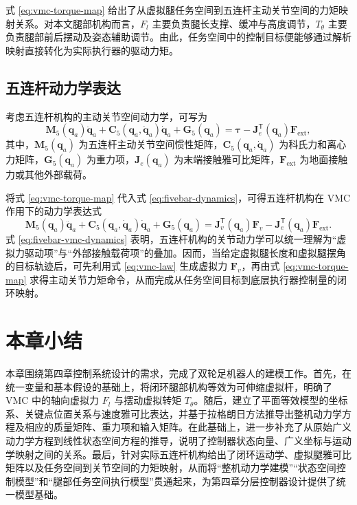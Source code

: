 式 \eqref{eq:vmc-torque-map} 给出了从虚拟腿任务空间到五连杆主动关节空间的力矩映射关系。对本文腿部机构而言，$F_l$ 主要负责腿长支撑、缓冲与高度调节，$T_\theta$ 主要负责腿部前后摆动及姿态辅助调节。由此，任务空间中的控制目标便能够通过解析映射直接转化为实际执行器的驱动力矩。

\subsection{五连杆动力学表达}

考虑五连杆机构的主动关节空间动力学，可写为
\begin{equation}
  \boldsymbol{M}_5(\boldsymbol{q}_a)\ddot{\boldsymbol{q}}_a
  +
  \boldsymbol{C}_5(\boldsymbol{q}_a, \dot{\boldsymbol{q}}_a)\dot{\boldsymbol{q}}_a
  +
  \boldsymbol{G}_5(\boldsymbol{q}_a)
  =
  \boldsymbol{\tau}
  -
  \boldsymbol{J}_e^\mathsf{T}(\boldsymbol{q}_a)\boldsymbol{F}_{\mathrm{ext}},
  \label{eq:fivebar-dynamics}
\end{equation}
其中，$\boldsymbol{M}_5(\boldsymbol{q}_a)$ 为五连杆主动关节空间惯性矩阵，$\boldsymbol{C}_5(\boldsymbol{q}_a, \dot{\boldsymbol{q}}_a)$ 为科氏力和离心力矩阵，$\boldsymbol{G}_5(\boldsymbol{q}_a)$ 为重力项，$\boldsymbol{J}_e(\boldsymbol{q}_a)$ 为末端接触雅可比矩阵，$\boldsymbol{F}_{\mathrm{ext}}$ 为地面接触力或其他外部载荷。

将式 \eqref{eq:vmc-torque-map} 代入式 \eqref{eq:fivebar-dynamics}，可得五连杆机构在 VMC 作用下的动力学表达式
\begin{equation}
  \boldsymbol{M}_5(\boldsymbol{q}_a)\ddot{\boldsymbol{q}}_a
  +
  \boldsymbol{C}_5(\boldsymbol{q}_a, \dot{\boldsymbol{q}}_a)\dot{\boldsymbol{q}}_a
  +
  \boldsymbol{G}_5(\boldsymbol{q}_a)
  =
  \boldsymbol{J}_v^\mathsf{T}(\boldsymbol{q}_a)\boldsymbol{F}_v
  -
  \boldsymbol{J}_e^\mathsf{T}(\boldsymbol{q}_a)\boldsymbol{F}_{\mathrm{ext}}.
  \label{eq:fivebar-vmc-dynamics}
\end{equation}
式 \eqref{eq:fivebar-vmc-dynamics} 表明，五连杆机构的关节动力学可以统一理解为“虚拟力驱动项”与“外部接触载荷项”的叠加。因而，当给定虚拟腿长度和虚拟腿摆角的目标轨迹后，可先利用式 \eqref{eq:vmc-law} 生成虚拟力 $\boldsymbol{F}_v$，再由式 \eqref{eq:vmc-torque-map} 求得主动关节力矩命令，从而完成从任务空间目标到底层执行器控制量的闭环映射。

\section{本章小结}

本章围绕第四章控制系统设计的需求，完成了双轮足机器人的建模工作。首先，在统一变量和基本假设的基础上，将闭环腿部机构等效为可伸缩虚拟杆，明确了 VMC 中的轴向虚拟力 $F_l$ 与摆动虚拟转矩 $T_\theta$。随后，建立了平面等效模型的坐标系、关键点位置关系与速度雅可比表达，并基于拉格朗日方法推导出整机动力学方程及相应的质量矩阵、重力项和输入矩阵。在此基础上，进一步补充了从原始广义动力学方程到线性状态空间方程的推导，说明了控制器状态向量、广义坐标与运动学映射之间的关系。最后，针对实际五连杆机构给出了闭环运动学、虚拟腿雅可比矩阵以及任务空间到关节空间的力矩映射，从而将“整机动力学建模”“状态空间控制模型”和“腿部任务空间执行模型”贯通起来，为第四章分层控制器设计提供了统一模型基础。
